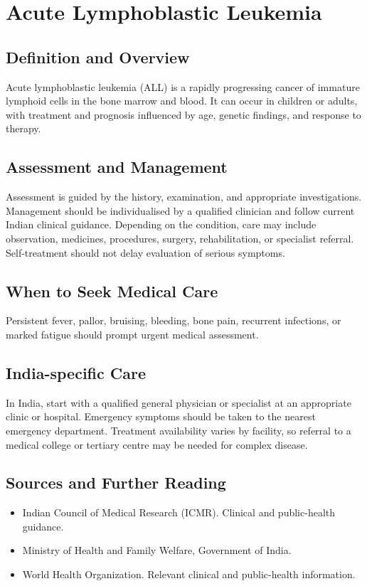 \chapter{Acute Lymphoblastic Leukemia}

\section*{Definition and Overview}
Acute lymphoblastic leukemia (ALL) is a rapidly progressing cancer of immature lymphoid cells in the bone marrow and blood. It can occur in children or adults, with treatment and prognosis influenced by age, genetic findings, and response to therapy.

\section*{Assessment and Management}
Assessment is guided by the history, examination, and appropriate investigations. Management should be individualised by a qualified clinician and follow current Indian clinical guidance. Depending on the condition, care may include observation, medicines, procedures, surgery, rehabilitation, or specialist referral. Self-treatment should not delay evaluation of serious symptoms.

\section*{When to Seek Medical Care}
Persistent fever, pallor, bruising, bleeding, bone pain, recurrent infections, or marked fatigue should prompt urgent medical assessment.

\section*{India-specific Care}
In India, start with a qualified general physician or specialist at an appropriate clinic or hospital. Emergency symptoms should be taken to the nearest emergency department. Treatment availability varies by facility, so referral to a medical college or tertiary centre may be needed for complex disease.

\section*{Sources and Further Reading}
\begin{itemize}
    \item Indian Council of Medical Research (ICMR). Clinical and public-health guidance.
    \item Ministry of Health and Family Welfare, Government of India.
    \item World Health Organization. Relevant clinical and public-health information.
\end{itemize}


